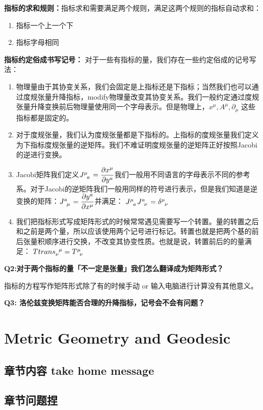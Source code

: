 \textbf{指标的求和规则：}指标求和需要满足两个规则，满足这两个规则的指标自动求和：
\begin{enumerate}
  \item 指标一个上一个下
  \item 指标字母相同
\end{enumerate}

\textbf{指标约定俗成书写记号：}
对于一些有指标的量，我们存在一些约定俗成的记号写法：
\begin{enumerate}
  \item 物理量由于其协变关系，我们会固定是上指标还是下指标；当然我们也可以通过度规张量升降指标，modify物理量改变其协变关系。我们一般约定通过度规张量升降变换前后物理量使用同一个字母表示。但是物理上，$ x^\mu, A^\mu, \partial_\mu$ 这些指标都是固定的。
  \item 对于度规张量，我们认为度规张量都是下指标的。上指标的度规张量我们定义为下指标度规张量的逆矩阵。我们不难证明度规张量的逆矩阵正好按照Jacobi的逆进行变换。
  \item Jacobi矩阵我们定义$ \tensor{J}{^\mu_a} = \displaystyle\frac{\partial x^\mu}{\partial y^a} $我们一般用不同语言的字母表示不同的参考系。对于Jacobi的逆矩阵我们一般用同样的符号进行表示，但是我们知道是逆变换的矩阵：$ \tensor{J}{^a_\mu} = \displaystyle\frac{\partial y^a}{\partial x^\mu} $并满足： $ \tensor{J}{^\mu_a}\tensor{J}{^a_\nu} = \tensor{\delta}{^\mu_\nu} $ 
  \item 我们把指标形式写成矩阵形式的时候常常遇见需要写一个转置。量的转置之后和之前是两个量，所以应该使用两个记号进行标记。转置也就是把两个基的前后张量积顺序进行交换，不改变其协变性质。也就是说，转置前后的的量满足：
    $ \tensor{Ttrans}{_\nu^\mu} = \tensor{T}{^\mu_\nu} $
\end{enumerate}

\bigskip
\textbf{Q2:对于两个指标的量「不一定是张量」我们怎么翻译成为矩阵形式？}

指标的方程写作矩阵形式除了有的时候手动 or 输入电脑进行计算没有其他意义。


\textbf{Q3: 洛伦兹变换矩阵能否合理的升降指标，记号会不会有问题？}


\section{Metric Geometry and Geodesic}

\subsection{章节内容 take home message}



\subsection{章节问题捏}




